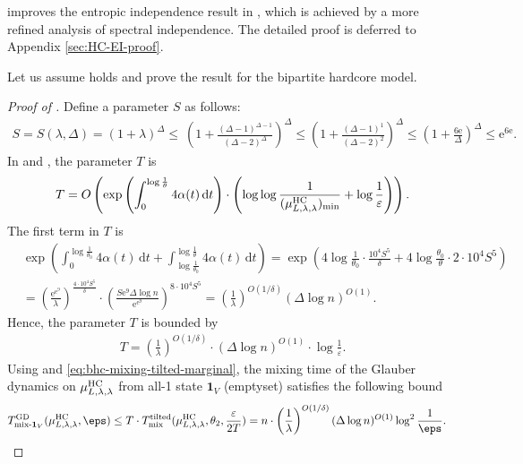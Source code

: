 \documentclass[11pt,a4paper]{article}
\newcommand{\e}{\mathrm{e}}
\renewcommand{\epsilon}{\varepsilon}
\newcommand{\mixtl}{T_{\textnormal{mix}}^{\textnormal{tilted}}}
\newcommand{\mixmax}{T_{\textnormal{mix-}\*1_V}^{\textnormal{GD}}}
\theoremstyle{definition}
\renewcommand{\d}{\,\-d}
\def\*#1{\mathbf{#1}} %
\def\-#1{\mathrm{#1}} %
\begin{document}
     improves the entropic independence result in \cite{Chen0Y23}, which is achieved by a more refined analysis of spectral independence. The detailed proof is deferred to Appendix \ref{sec:HC-EI-proof}.


Let us assume  holds and prove the result for the bipartite hardcore model.

\begin{proof}[Proof of ]
Define a parameter $S$ as follows:
\begin{align*}
    S=S(\lambda, \Delta)=(1+\lambda)^\Delta\leq\ \left(1+\frac{(\Delta-1)^{\Delta-1}}{(\Delta-2)^\Delta}\right)^\Delta\leq \left(1+\frac{(\Delta-1)^1}{(\Delta-2)^2}\right)^\Delta\leq \left(1+\frac{6\e}{\Delta}\right)^\Delta\leq \e^{6\e}.
\end{align*}
In  and , the parameter $T$ is 
\begin{align*}
    T=O\left(\exp\left(\int_0^{\log\frac{1}{\theta}}4\alpha(t) \d t \right)\cdot\left(\log\log\frac{1}{({\mu}_{L,\lambda,\lambda}^{\textnormal{HC}})_{\min}}+\log\frac{1}{\epsilon}\right)\right).
\end{align*}
The first term in $T$ is 
\begin{align*}
    &\exp\left ( \int_0^{\log \frac{1}{\theta_0}}4\alpha(t)\d t +\int_{\log \frac{1}{\theta_0}}^{\log \frac{1}{\theta}}4\alpha(t)\d t  \right ) =\exp\left (4 \log \frac{1}{\theta_0}\cdot \frac{10^4S^5}{\delta} +4\log \frac{\theta_0}{\theta} \cdot 2\cdot10^4S^5 \right )\\
    &=\left(\frac{\e^{\e^9}}{\lambda}\right)^{\frac{4\cdot10^4S^5}{\delta}}\cdot \left( \frac{S\e^9\Delta\log n}{\e^{\e^9}}\right )^{8\cdot10^4S^5}=\left(\frac{1}{\lambda} \right)^{O(1/\delta)} (\Delta\log n)^{O(1)}.
\end{align*}
Hence, the parameter $T$ is bounded by
\begin{align*}
    T=\left(\frac{1}{\lambda} \right)^{O(1/\delta)}\cdot (\Delta\log n)^{O(1)}\cdot \log \frac{1}{\epsilon}.
\end{align*}
Using  and \eqref{eq:bhc-mixing-tilted-marginal}, the mixing time of the Glauber dynamics on $\mu_{L,\lambda,\lambda}^{\textnormal{HC}}$ from all-1 state $\*1_V$ (emptyset) satisfies the following bound
\begin{align*}
    \mixmax(\mu_{L,\lambda,\lambda}^{\textnormal{HC}},\eps)&\leq T\cdot \mixtl(\mu_{L,\lambda,\lambda}^{\textnormal{HC}},\theta_2,\frac{\epsilon}{2T})
    =n \cdot \left(\frac{1}{\lambda} \right)^{O(1/\delta)}(\Delta\log n)^{O(1)}\log^2 \frac{1}{\eps}. \qedhere
\end{align*}
\end{proof}
\end{document}
